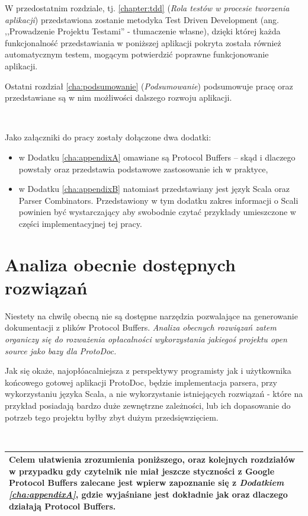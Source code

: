 \documentclass[pdflatex,11pt]{aghdpl}
\begin{document}
W przedostatnim rozdziale, tj. \ref{chapter:tdd} (\textit{Rola testów w procesie tworzenia aplikacji}) przedstawiona zostanie metodyka Test Driven Development
(ang. ,,Prowadzenie Projektu Testami'' - tłumaczenie własne), dzięki której każda funkcjonalność przedstawiania w poniższej aplikacji pokryta została 
również automatycznym testem, mogącym potwierdzić poprawne funkcjonowanie aplikacji.

Ostatni rozdział \ref{cha:podsumowanie} (\textit{Podsumowanie}) podsumowuje pracę oraz przedstawiane są w nim możliwości dalszego rozwoju aplikacji.

~\\\*

Jako załączniki do pracy zostały dołączone dwa dodatki:
\begin{itemize}
 \item w Dodatku \ref{cha:appendixA} omawiane są Protocol Buffers -- skąd i dlaczego powstały oraz przedstawia 
       podstawowe zastosowanie ich w praktyce, 
 \item w Dodatku \ref{cha:appendixB} natomiast przedstawiany jest język Scala oraz Parser Combinators. Przedstawiony w tym dodatku zakres informacji o Scali
       powinien być wystarczający aby swobodnie czytać przykłady umieszczone w części implementacyjnej tej pracy.
\end{itemize}

\chapter{Analiza obecnie dostępnych rozwiązań}
\label{sec:dostepneNarzedzia}


Niestety na chwilę obecną nie są dostępne narzędzia pozwalające na generowanie dokumentacji z plików Protocol Buffers.
\textit{Analiza obecnych rozwiązań zatem organiczy się do rozważenia opłacalności wykorzystania jakiegoś projektu open source jako bazy dla ProtoDoc.}

Jak się okaże, najopłóacalniejsza z perspektywy programisty jak i użytkownika końcowego gotowej aplikacji ProtoDoc, będzie implementacja parsera,
przy wykorzystaniu języka Scala, a nie wykorzystanie istniejących rozwiązań - które na przykład posiadają bardzo duże zewnętrzne zależności, lub
ich dopasowanie do potrzeb tego projektu byłby zbyt dużym przedsięwzięciem.

~\\\*

\begin{center}
  \begin{tabular}{ | p{\textwidth} |}
    \hline
      Celem ułatwienia zrozumienia poniższego, oraz kolejnych rozdziałów w przypadku gdy czytelnik nie miał 
      jeszcze styczności z Google Protocol Buffers zalecane jest wpierw
      zapoznanie się z \textit{Dodatkiem \ref{cha:appendixA}}, gdzie wyjaśniane jest dokładnie jak oraz dlaczego działają Protocol Buffers.\\ \hline
  \end{tabular}
\end{center}
\end{document}
